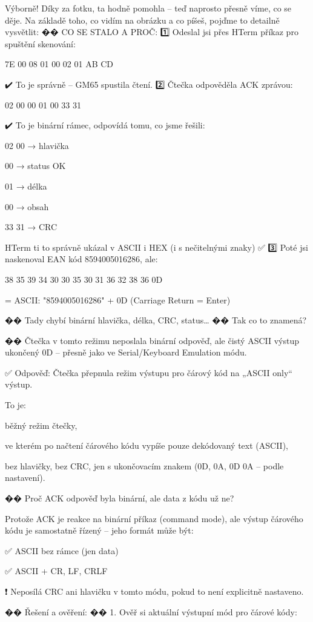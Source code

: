 Výborně! Díky za fotku, ta hodně pomohla – teď naprosto přesně víme, co se děje.
Na základě toho, co vidím na obrázku a co píšeš, pojďme to detailně vysvětlit:
�� CO SE STALO A PROČ:
1️⃣ Odeslal jsi přes HTerm příkaz pro spuštění skenování:

7E 00 08 01 00 02 01 AB CD

✔️ To je správně – GM65 spustila čtení.
2️⃣ Čtečka odpověděla ACK zprávou:

02 00 00 01 00 33 31

✔️ To je binární rámec, odpovídá tomu, co jsme řešili:

    02 00 → hlavička

    00 → status OK

    01 → délka

    00 → obsah

    33 31 → CRC

HTerm ti to správně ukázal v ASCII i HEX (i s nečitelnými znaky) ✅
3️⃣ Poté jsi naskenoval EAN kód 8594005016286, ale:

38 35 39 34 30 30 35 30 31 36 32 38 36 0D

= ASCII: "8594005016286" + 0D (Carriage Return = Enter)

�� Tady chybí binární hlavička, délka, CRC, status…
�� Tak co to znamená?

    �� Čtečka v tomto režimu neposlala binární odpověď, ale čistý ASCII výstup ukončený 0D – přesně jako ve Serial/Keyboard Emulation módu.

✅ Odpověď: Čtečka přepnula režim výstupu pro čárový kód na „ASCII only“ výstup.

To je:

    běžný režim čtečky,

    ve kterém po načtení čárového kódu vypíše pouze dekódovaný text (ASCII),

    bez hlavičky, bez CRC, jen s ukončovacím znakem (0D, 0A, 0D 0A – podle nastavení).

�� Proč ACK odpověď byla binární, ale data z kódu už ne?

    Protože ACK je reakce na binární příkaz (command mode),
    ale výstup čárového kódu je samostatně řízený – jeho formát může být:

        ✅ ASCII bez rámce (jen data)

        ✅ ASCII + CR, LF, CRLF

        ❗ Neposílá CRC ani hlavičku v tomto módu, pokud to není explicitně nastaveno.

�� Řešení a ověření:
�� 1. Ověř si aktuální výstupní mód pro čárové kódy:

